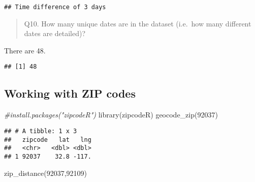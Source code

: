 \documentclass[
]{article}
\newenvironment{Shaded}{\begin{snugshade}}{\end{snugshade}}
\newcommand{\CommentTok}[1]{\textcolor[rgb]{0.56,0.35,0.01}{\textit{#1}}}
\newcommand{\FunctionTok}[1]{\textcolor[rgb]{0.00,0.00,0.00}{#1}}
\newcommand{\NormalTok}[1]{#1}
\newcommand{\OtherTok}[1]{\textcolor[rgb]{0.56,0.35,0.01}{#1}}
\newcommand{\SpecialCharTok}[1]{\textcolor[rgb]{0.00,0.00,0.00}{#1}}
\newcommand{\StringTok}[1]{\textcolor[rgb]{0.31,0.60,0.02}{#1}}
\begin{document}
\begin{verbatim}
## Time difference of 3 days
\end{verbatim}

\begin{quote}
Q10. How many unique dates are in the dataset (i.e.~how many different
dates are detailed)?
\end{quote}

There are 48.

\begin{Shaded}
\end{Shaded}

\begin{verbatim}
## [1] 48
\end{verbatim}

\hypertarget{working-with-zip-codes}{%
\subsection{Working with ZIP codes}\label{working-with-zip-codes}}

\begin{Shaded}
\begin{Highlighting}[]
\CommentTok{\#install.packages("zipcodeR")}
\FunctionTok{library}\NormalTok{(zipcodeR)}
\FunctionTok{geocode\_zip}\NormalTok{(}\StringTok{\textquotesingle{}92037\textquotesingle{}}\NormalTok{)}
\end{Highlighting}
\end{Shaded}

\begin{verbatim}
## # A tibble: 1 x 3
##   zipcode   lat   lng
##   <chr>   <dbl> <dbl>
## 1 92037    32.8 -117.
\end{verbatim}

\begin{Shaded}
\begin{Highlighting}[]
\FunctionTok{zip\_distance}\NormalTok{(}\StringTok{\textquotesingle{}92037\textquotesingle{}}\NormalTok{,}\StringTok{\textquotesingle{}92109\textquotesingle{}}\NormalTok{)}
\end{Highlighting}
\end{Shaded}
\end{document}
